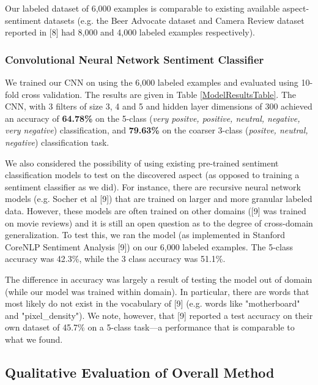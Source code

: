 \documentclass{article} %
\begin{document}
Our labeled dataset of 6,000 examples is comparable to existing available aspect-sentiment datasets (e.g. the Beer Advocate dataset and Camera Review dataset reported in [8] had 8,000 and 4,000 labeled examples respectively).


\subsubsection{Convolutional Neural Network Sentiment Classifier}
We trained our CNN on using the 6,000 labeled examples and evaluated using 10-fold cross validation. The results are given in Table \ref{ModelResultsTable}. The CNN, with 3 filters of size 3, 4 and 5 and hidden layer dimensions of 300 achieved an accuracy of \textbf{64.78\%} on the 5-class (\textit{very positve, positive, neutral, negative, very negative}) classification, and \textbf{79.63\%} on the coarser 3-class (\textit{positve, neutral, negative}) classification task.

We also considered the possibility of using existing pre-trained sentiment classification models to test on the discovered aspect (as opposed to training a sentiment classifier as we did). For instance, there are recursive neural network models (e.g. Socher et al [9]) that are trained on larger and more granular labeled data. However, these models are often trained on other domains ([9] was trained on movie reviews) and it is still an open question as to the degree of cross-domain generalization. To test this, we ran the model (as implemented in Stanford CoreNLP Sentiment Analysis [9]) on our 6,000 labeled examples. The 5-class accuracy was 42.3\%, while the 3 class accuracy was 51.1\%.

The difference in accuracy was largely a result of testing the model out of domain (while our model was trained within domain). In particular, there are words that most likely do not exist in the vocabulary of [9] (e.g. words like "motherboard" and "pixel\_density"). We note, however, that [9] reported a test accuracy on their own dataset of 45.7\% on a 5-class task---a performance that is comparable to what we found.

\subsection{Qualitative Evaluation of Overall Method}
\end{document}
